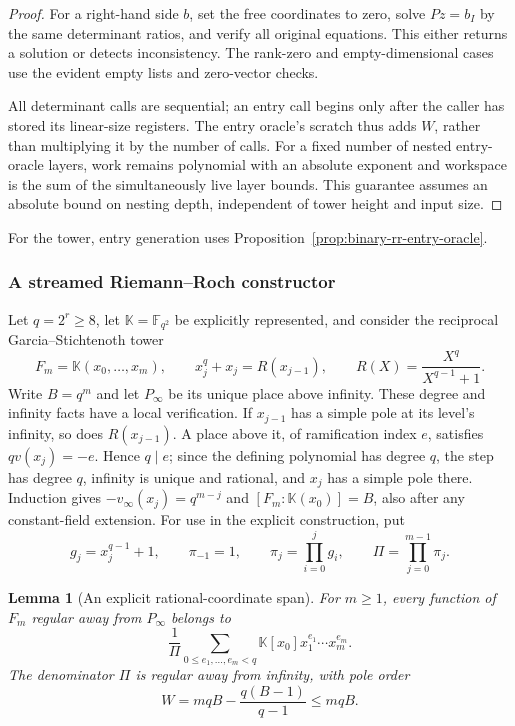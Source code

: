 \documentclass[11pt,letterpaper]{article}
\newtheorem{lemma}[theorem]{Lemma}
\numberwithin{equation}{section}
\begin{document}
\begin{proof}
For a right-hand side $b$, set the free coordinates to zero, solve $Pz=b_I$ by the same determinant ratios, and verify all original equations.
This either returns a solution or detects inconsistency.
The rank-zero and empty-dimensional cases use the evident empty lists and zero-vector checks.

All determinant calls are sequential; an entry call begins only after the caller has stored its linear-size registers.
The entry oracle's scratch thus adds $W$, rather than multiplying it by the number of calls.
For a fixed number of nested entry-oracle layers, work remains polynomial with an absolute exponent and workspace is the sum of the simultaneously live layer bounds.
This guarantee assumes an absolute bound on nesting depth, independent of tower height and input size.
\end{proof}

For the tower, entry generation uses Proposition~\ref{prop:binary-rr-entry-oracle}.



\subsubsection{A streamed Riemann--Roch constructor}
\label{sec:binary-rr-constructor}

Let $q=2^r\geq8$, let $\mathbb K=\mathbb F_{q^2}$ be explicitly represented, and consider the reciprocal Garcia--Stichtenoth tower
\[
 F_m=\mathbb K(x_0,\ldots,x_m),\qquad
 x_j^q+x_j=R(x_{j-1}),\qquad
 R(X)=\frac{X^q}{X^{q-1}+1}.
\]
Write $B=q^m$ and let $P_\infty$ be its unique place above infinity.
These degree and infinity facts have a local verification.
If $x_{j-1}$ has a simple pole at its level's infinity, so does $R(x_{j-1})$.
A place above it, of ramification index $e$, satisfies $qv(x_j)=-e$.
Hence $q\mid e$; since the defining polynomial has degree $q$, the step has degree $q$, infinity is unique and rational, and $x_j$ has a simple pole there.
Induction gives $-v_\infty(x_j)=q^{m-j}$ and $[F_m:\mathbb K(x_0)]=B$, also after any constant-field extension.
For use in the explicit construction, put
\[
 g_j=x_j^{q-1}+1,\qquad \pi_{-1}=1,\qquad
 \pi_j=\prod_{i=0}^j g_i,\qquad
 \Pi=\prod_{j=0}^{m-1}\pi_j.
\]

\begin{lemma}[An explicit rational-coordinate span]
\label{lem:binary-rr-trace-span}
For $m\geq1$, every function of $F_m$ regular away from $P_\infty$ belongs to
\begin{equation}
 \frac1\Pi\sum_{0\leq e_1,\ldots,e_m<q}
       \mathbb K[x_0]x_1^{e_1}\cdots x_m^{e_m}.
 \label{eq:binary-rr-trace-span}
\end{equation}
The denominator $\Pi$ is regular away from infinity, with pole order
\begin{equation}
 W=mqB-\frac{q(B-1)}{q-1}\leq mqB.
 \label{eq:binary-rr-denominator-weight}
\end{equation}
\end{lemma}
\end{document}
